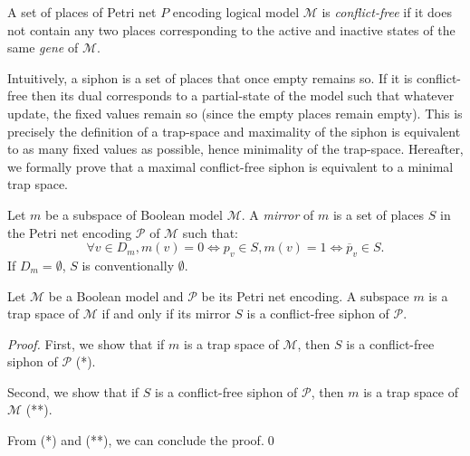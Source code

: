 \documentclass[runningheads]{llncs}
\begin{document}
\begin{definition}

  A set of places of Petri net \(P\) encoding logical model \(\mathcal{M}\) is \emph{conflict-free} if it does not contain any two places corresponding to the active and inactive states of the same \emph{gene} of \(\mathcal{M}\).

\end{definition}

Intuitively, a siphon is a set of places that once empty remains so.
If it is conflict-free then its dual corresponds to a partial-state of the model such that whatever update, the fixed values remain so (since the empty places remain empty).
This is precisely the definition of a trap-space and maximality of the siphon is equivalent to as many fixed values as possible, hence minimality of the trap-space. Hereafter, we formally prove that a maximal conflict-free siphon is equivalent to a minimal trap space. 

\begin{definition}

  Let \(m\) be a subspace of Boolean model \(\mathcal{M}\). A \emph{mirror} of $m$ is a set of places $S$ in the Petri net encoding \(\mathcal{P}\) of \(\mathcal{M}\) such that:
  \[\forall v \in D_m, m(v) = 0 \Leftrightarrow p_v \in S, m(v) = 1 \Leftrightarrow \overline{p}_v \in S.\] If \(D_m = \emptyset\), \(S\) is conventionally \(\emptyset\).  

\end{definition}

\begin{theorem}
\label{theo:ts_2_sp}

  Let \(\mathcal{M}\) be a Boolean model and \(\mathcal{P}\) be its Petri net encoding. A subspace \(m\) is a trap space of \(\mathcal{M}\) if and only if its mirror \(S\) is a conflict-free siphon of \(\mathcal{P}\).

\end{theorem}

\begin{proof}

  First, we show that if \(m\) is a trap space of \(\mathcal{M}\), then \(S\) is a conflict-free siphon of \(\mathcal{P}\) (*).
  
  Second, we show that if \(S\) is a conflict-free siphon of \(\mathcal{P}\), then \(m\) is a trap space of \(\mathcal{M}\) (**).
  
  From (*) and (**), we can conclude the proof.\qed
  
\end{proof}
\end{document}
